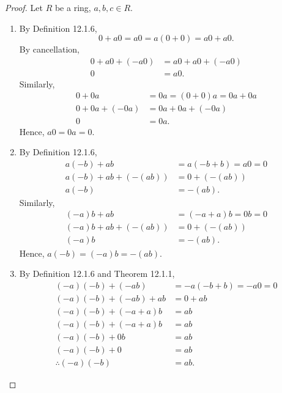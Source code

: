 \documentclass{article}
\theoremstyle{definition}
\begin{document}
    \begin{proof}
        Let $R$ be a ring, $a,b,c \in R$.
        \begin{enumerate}
            \item By Definition 12.1.6,
            \begin{equation*}
                0+a0=a0=a(0+0)=a0+a0.
            \end{equation*}
            By cancellation,
            \begin{align*}
                0+a0+(-a0)&=a0+a0+(-a0) \\
                0&=a0.
            \end{align*}
            Similarly,
             \begin{align*}
                0+0a&=0a=(0+0)a=0a+0a \\
                0+0a+(-0a)&=0a+0a+(-0a) \\
                0&=0a.
            \end{align*}
            Hence, $a0=0a=0$.
            
            \item By Definition 12.1.6,
            \begin{align*}
                a(-b)+ab&=a(-b+b)=a0=0 \\
                a(-b)+ab+(-(ab))&=0+(-(ab)) \\
                a(-b)&=-(ab).
            \end{align*}
            Similarly,
            \begin{align*}
                (-a)b+ab&=(-a+a)b=0b=0 \\
                (-a)b+ab+(-(ab))&=0+(-(ab)) \\
                (-a)b&=-(ab).
            \end{align*}
            Hence, $a(-b)=(-a)b=-(ab)$.
            \item By Definition 12.1.6 and Theorem 12.1.1,
            \begin{align*}
                (-a)(-b)+(-ab)&=-a(-b+b)=-a0=0 \\
                (-a)(-b)+(-ab)+ab&=0+ab \\
                (-a)(-b)+(-a+a)b&=ab \\
                (-a)(-b)+(-a+a)b&=ab \\
                (-a)(-b)+0b&=ab \\
                (-a)(-b)+0&=ab \\
                \therefore (-a)(-b)&=ab.
            \end{align*}
            

\end{enumerate}
\end{proof}
\end{document}
